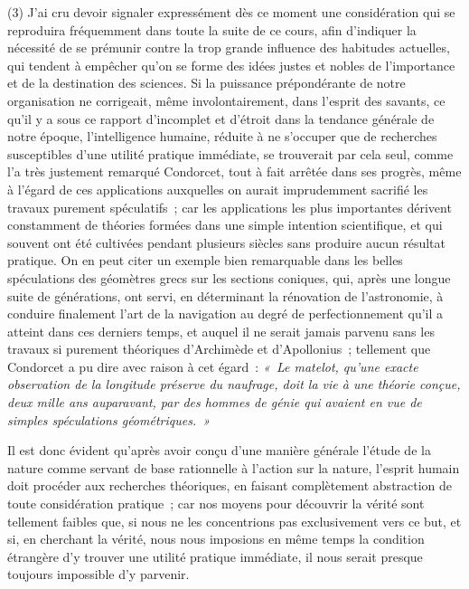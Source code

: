 \documentclass[french,twoside]{book} %
\begin{document}
(3) J’ai cru devoir signaler expressément dès ce moment une considération qui se reproduira fréquemment dans toute la suite de ce cours, afin d’indiquer la nécessité de se prémunir contre la trop grande influence des habitudes actuelles, qui tendent à empêcher qu’on se forme des idées justes et nobles de l’importance et de la destination des sciences. Si la puissance prépondérante de notre organisation ne corrigeait, même involontairement, dans l’esprit des savants, ce qu’il y a sous ce rapport d’incomplet et d’étroit dans la tendance générale de notre époque, l’intelligence humaine, réduite à ne s’occuper que de recherches susceptibles d’une utilité pratique immédiate, se trouverait par cela seul, comme l’a très justement remarqué Condorcet, tout à fait arrêtée dans ses progrès, même à l’égard de ces applications auxquelles on aurait imprudemment sacrifié les travaux purement spéculatifs ; car les applications les plus importantes dérivent constamment de théories formées dans une simple intention scientifique, et qui souvent ont été cultivées pendant plusieurs siècles sans produire aucun résultat pratique. On en peut citer un exemple bien remarquable dans les belles spéculations des géomètres grecs sur les sections coniques, qui, après une longue suite de générations, ont servi, en déterminant la rénovation de l’astronomie, à conduire finalement l’art de la navigation au degré de perfectionnement qu’il a atteint dans ces derniers temps, et auquel il ne serait jamais parvenu sans les travaux si purement théoriques d’Archimède et d’Apollonius ; tellement que Condorcet a pu dire avec raison à cet égard : \emph{« Le matelot, qu’une exacte observation de la longitude préserve du naufrage, doit la vie à une théorie conçue, deux mille ans auparavant, par des hommes de génie qui avaient en vue de simples spéculations géométriques. »}\par
Il est donc évident qu’après avoir conçu d’une manière générale l’étude de la nature comme servant de base rationnelle à l’action sur la nature, l’esprit humain doit procéder aux recherches théoriques, en faisant complètement abstraction de toute considération pratique ; car nos moyens pour découvrir la vérité sont tellement faibles que, si nous ne les concentrions pas exclusivement vers ce but, et si, en cherchant la vérité, nous nous imposions en même temps la condition étrangère d’y trouver une utilité pratique immédiate, il nous serait presque toujours impossible d’y parvenir.\par
\end{document}
